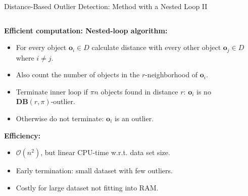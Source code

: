 \begin{frame}{Distance-Based Outlier Detection: Method with a Nested Loop II}
	\begin{columns}[t]
		\begin{column}{0.5\textwidth}
			\vspace*{-0.5em}
			\textbf{Efficient computation: {\color{airforceblue}Nested-loop algorithm}:}
			\begin{itemize}
				\item For every object $\mathbf{o}_i\in D$ calculate distance with every other object $\mathbf{o}_j \in D$ where $i\neq j$.
				\item Also count the number of objects in the $r$-neighborhood of $\mathbf{o}_i$.
				\item Terminate inner loop if $\pi n$ objects found in distance $r$: $\mathbf{o}_i$ is no $\mathbf{DB}(r, \pi)$-outlier.
				\item Otherwise do not terminate: $\mathbf{o}_i$ is an outlier.
			\end{itemize}
			\textbf{Efficiency:}
			\begin{itemize}
				\item $\mathcal{O}(n^2)$, but linear CPU-time w.r.t. data set size.
				\item Early termination: small dataset with few outliers.
				\item Costly for large dataset not fitting into RAM.
			\end{itemize}
		\end{column}

		\begin{column}{0.5\textwidth}
			\vspace*{1em}
			\scriptsize
			\begin{algorithm}[H]
				\SetAlgoVlined
				\BlankLine
				\BlankLine
			\end{algorithm}
		\end{column}
	\end{columns}
\end{frame}


